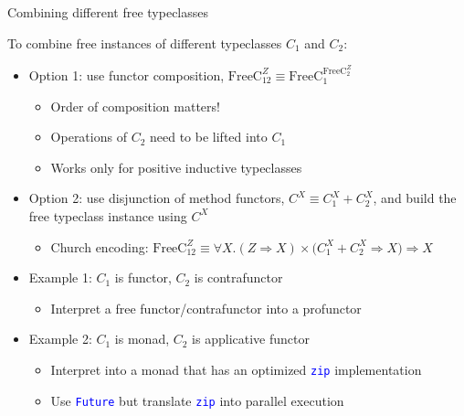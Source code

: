 \documentclass[english,,russian]{beamer}
\begin{document}
\begin{frame}{Combining different free typeclasses}

\vspace{-0.15cm}To combine free instances of different typeclasses
$C_{1}$ and $C_{2}$:
\begin{itemize}
\item Option 1: use functor composition, $\text{FreeC}_{12}^{Z}\equiv\text{FreeC}_{1}^{\text{FreeC}_{2}^{Z}}$
\begin{itemize}
\item Order of composition matters!
\item Operations of $C_{2}$ need to be lifted into $C_{1}$
\item Works only for positive inductive typeclasses
\end{itemize}
\item Option 2: use disjunction of method functors, $C^{X}\equiv C_{1}^{X}+C_{2}^{X}$,
and build the free typeclass instance using $C^{X}$
\begin{itemize}
\item Church encoding: $\text{FreeC}_{12}^{Z}\equiv\forall X.\left(Z\Rightarrow X\right)\times\big(C_{1}^{X}+C_{2}^{X}\Rightarrow X\big)\Rightarrow X$
\end{itemize}
\item Example 1: $C_{1}$ is functor, $C_{2}$ is contrafunctor
\begin{itemize}
\item Interpret a free functor/contrafunctor into a profunctor
\end{itemize}
\item Example 2: $C_{1}$ is monad, $C_{2}$ is applicative functor
\begin{itemize}
\item Interpret into a monad that has an optimized \texttt{\textcolor{blue}{\footnotesize{}zip}}
implementation
\item Use \texttt{\textcolor{blue}{\footnotesize{}Future}} but translate
\texttt{\textcolor{blue}{\footnotesize{}zip}} into parallel execution
\end{itemize}
\end{itemize}
\end{frame}
\end{document}
